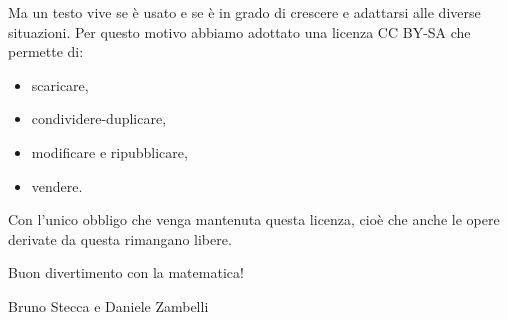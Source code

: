 Ma un testo vive se è usato e se è in grado di crescere e adattarsi alle 
diverse situazioni. Per questo motivo abbiamo adottato una licenza CC BY-SA che 
permette di:
\begin{itemize} [nosep]
\item scaricare,
\item condividere-duplicare,
\item modificare e ripubblicare,
\item vendere.
\end{itemize}

Con l'unico obbligo che venga mantenuta questa licenza, cioè che anche le 
opere derivate da questa rimangano libere.


Buon divertimento con la matematica!

\begin{flushright}
Bruno Stecca e Daniele Zambelli
\end{flushright}

